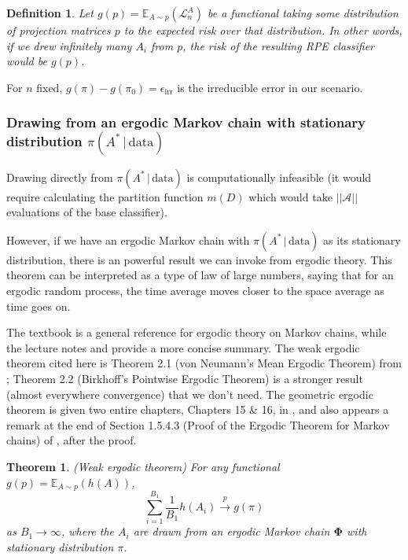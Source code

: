 \documentclass{amsart}
\newtheorem{definition}{Definition}
\newtheorem{theorem}{Theorem}
\newcommand\E{\mathbb{E}}
\newcommand\risk{\mathcal{L}}
\begin{document}
\begin{definition}
Let $g(p)=\E_{A\sim p}(\risk_n^A)$ be a functional taking some distribution of projection matrices $p$ to the expected risk over that distribution. In other words, if we drew infinitely many $A_i$ from $p$, the risk of the resulting RPE classifier would be $g(p)$.
\end{definition}

For $n$ fixed, $g(\pi)-g(\pi_0)=\epsilon_\mathrm{irr}$ is the irreducible error in our scenario.

\subsubsection{Drawing from an ergodic Markov chain with stationary distribution $\pi(A^*\,|\,\mathrm{data})$}

Drawing directly from $\pi(A^*\,|\,\mathrm{data})$ is computationally infeasible (it would require calculating the partition function $m(D)$ which would take $||\mathcal A||$ evaluations of the base classifier).

However, if we have an ergodic Markov chain with $\pi(A^*\,|\,\mathrm{data})$ as its stationary distribution, there is an powerful result we can invoke from ergodic theory. This theorem can be interpreted as a type of law of large numbers, saying that for an ergodic random process, the time average moves closer to the space average as time goes on.

The textbook \cite{MT93} is a general reference for ergodic theory on Markov chains, while the lecture notes \cite{Sarig08} and \cite{Geyer12} provide a more concise summary. The weak ergodic theorem cited here is Theorem 2.1 (von Neumann's Mean Ergodic Theorem) from \cite{Sarig08}; Theorem 2.2 (Birkhoff's Pointwise Ergodic Theorem) is a stronger result (almost everywhere convergence) that we don't need. The geometric ergodic theorem is given two entire chapters, Chapters 15 \& 16, in \cite{MT93}, and also appears a remark at the end of Section 1.5.4.3 (Proof of the Ergodic Theorem for Markov chains) of \cite{Sarig08}, after the proof.

\begin{theorem}
(Weak ergodic theorem) For any functional $g(p)=\E_{A\sim p}(h(A))$, 
\[
\sum_{i=1}^{B_1}\frac{1}{B_1} h(A_i) \overset{p}{\to} g(\pi)
\]
as $B_1\to\infty$, where the $A_i$ are drawn from an ergodic Markov chain $\bm{\Phi}$ with stationary distribution $\pi$.
\end{theorem}
\end{document}
